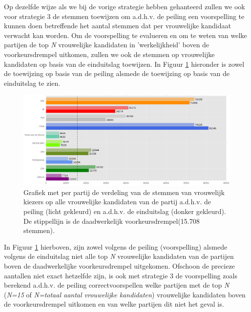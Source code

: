 Op dezelfde wijze als we bij de vorige strategie hebben gehanteerd zullen we ook voor strategie 3 de stemmen toewijzen om a.d.h.v. de peiling een voorspelling te kunnen doen betreffende het aantal stemmen dat per vrouwelijke kandidaat verwacht kan worden. Om de voorspelling te evalueren en om te weten van welke partijen de top \textit{N} vrouwelijke kandidaten in 'werkelijkheid' boven de voorkeursdrempel uitkomen, zullen we ook de stemmen op vrouwelijke kandidaten op basis van de einduitslag toewijzen. In Figuur \ref{fig:stemmenS31V} hieronder is zowel de toewijzing op basis van de peiling alsmede de toewijzing op basis van de einduitslag te zien.  



\begin{figure}[H]

	\includegraphics[width=\linewidth]	{stemmen_op_vrouwen_top15_of_topN_samen.png}

			\caption{Grafiek met per partij de verdeling van de stemmen van vrouwelijk kiezers op alle vrouwelijke kandidaten van de partij a.d.h.v. de peiling (licht gekleurd) en a.d.h.v. de einduitslag (donker gekleurd). De stippellijn is de daadwerkelijk voorkeursdrempel(15.708 stemmen).}

\label{fig:stemmenS31V}
\end{figure}

In Figuur \ref{fig:stemmenS31V} hierboven, zijn zowel volgens de peiling (voorspelling) alsmede volgens de einduitslag niet alle top \textit{N} vrouwelijke kandidaten van de partijen boven de daadwerkelijke voorkeursdrempel uitgekomen. Ofschoon de precieze aantallen niet exact hetzelfde zijn, is ook met strategie 3 de voorspelling zoals berekend a.d.h.v. de peiling correctvoorspellen welke partijen met de top \textit{N} (\textit{N=15} of \textit{N=totaal aantal vrouwelijke kandidaten}) vrouwelijke kandidaten boven de voorkeursdrempel uitkomen en van welke partijen dit niet het geval is.


